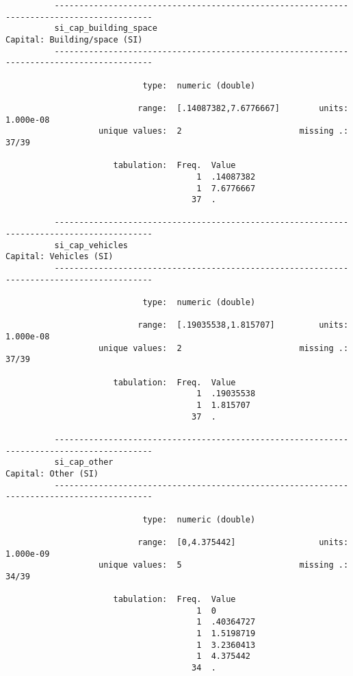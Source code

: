 \documentclass{article}
\begin{document}
\begin{verbatim}
          ------------------------------------------------------------------------------------------
          si_cap_building_space                                         Capital: Building/space (SI)
          ------------------------------------------------------------------------------------------
          
                            type:  numeric (double)
          
                           range:  [.14087382,7.6776667]        units:  1.000e-08
                   unique values:  2                        missing .:  37/39
          
                      tabulation:  Freq.  Value
                                       1  .14087382
                                       1  7.6776667
                                      37  .
          
          ------------------------------------------------------------------------------------------
          si_cap_vehicles                                                     Capital: Vehicles (SI)
          ------------------------------------------------------------------------------------------
          
                            type:  numeric (double)
          
                           range:  [.19035538,1.815707]         units:  1.000e-08
                   unique values:  2                        missing .:  37/39
          
                      tabulation:  Freq.  Value
                                       1  .19035538
                                       1  1.815707
                                      37  .
          
          ------------------------------------------------------------------------------------------
          si_cap_other                                                           Capital: Other (SI)
          ------------------------------------------------------------------------------------------
          
                            type:  numeric (double)
          
                           range:  [0,4.375442]                 units:  1.000e-09
                   unique values:  5                        missing .:  34/39
          
                      tabulation:  Freq.  Value
                                       1  0
                                       1  .40364727
                                       1  1.5198719
                                       1  3.2360413
                                       1  4.375442
                                      34  .
          

\end{verbatim}
\end{document}
